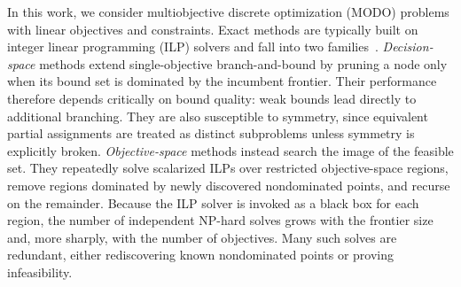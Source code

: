 \documentclass[letterpaper]{article}
\begin{document}

In this work, we consider multiobjective discrete optimization (MODO) problems with linear objectives and constraints. Exact methods are typically built on integer linear programming (ILP) solvers and fall into two families~\citep{halffmann2022exact}. \emph{Decision-space} methods extend single-objective branch-and-bound by pruning a node only when its bound set is dominated by the incumbent frontier. Their performance therefore depends critically on bound quality: weak bounds lead directly to additional branching. They are also susceptible to symmetry, since equivalent partial assignments are treated as distinct subproblems unless symmetry is explicitly broken. \emph{Objective-space} methods instead search the image of the feasible set. They repeatedly solve scalarized ILPs over restricted objective-space regions, remove regions dominated by newly discovered nondominated points, and recurse on the remainder. Because the ILP solver is invoked as a black box for each region, the number of independent NP-hard solves grows with the frontier size and, more sharply, with the number of objectives. Many such solves are redundant, either rediscovering known nondominated points or proving infeasibility.
\end{document}
